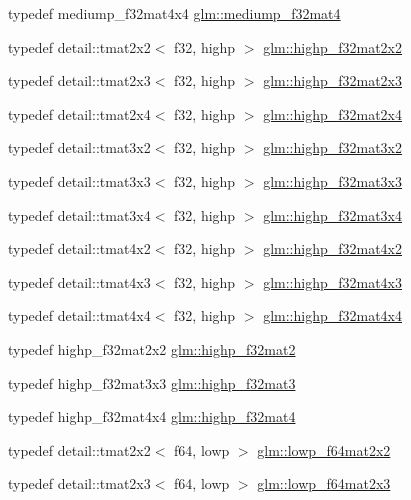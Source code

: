 \begin{CompactItemize}
typedef mediump\_\-f32mat4x4 \hyperlink{group__gtc__type__precision_g56bd98ec31b6abc0315d688d4ecd94a0}{glm::mediump\_\-f32mat4}
\item 
typedef detail::tmat2x2$<$ f32, highp $>$ \hyperlink{group__gtc__type__precision_gf3a2cc948ca6fd168391138ce6fdd100}{glm::highp\_\-f32mat2x2}
\item 
typedef detail::tmat2x3$<$ f32, highp $>$ \hyperlink{group__gtc__type__precision_g53613c1b93f81207065a8a935ff02a81}{glm::highp\_\-f32mat2x3}
\item 
typedef detail::tmat2x4$<$ f32, highp $>$ \hyperlink{group__gtc__type__precision_g9689dbe21bc976ca8069c63300b5887e}{glm::highp\_\-f32mat2x4}
\item 
typedef detail::tmat3x2$<$ f32, highp $>$ \hyperlink{group__gtc__type__precision_gf36b2b34ea881977c61491b0d3b25a28}{glm::highp\_\-f32mat3x2}
\item 
typedef detail::tmat3x3$<$ f32, highp $>$ \hyperlink{group__gtc__type__precision_g334eca23d23aef90972fb20c5b749ca3}{glm::highp\_\-f32mat3x3}
\item 
typedef detail::tmat3x4$<$ f32, highp $>$ \hyperlink{group__gtc__type__precision_ga71f504ecb02f9178026b01013b77ba0}{glm::highp\_\-f32mat3x4}
\item 
typedef detail::tmat4x2$<$ f32, highp $>$ \hyperlink{group__gtc__type__precision_g4d799497b303c2434fe709f81f6bd4dd}{glm::highp\_\-f32mat4x2}
\item 
typedef detail::tmat4x3$<$ f32, highp $>$ \hyperlink{group__gtc__type__precision_g5bd692575886422f501a379386e391d9}{glm::highp\_\-f32mat4x3}
\item 
typedef detail::tmat4x4$<$ f32, highp $>$ \hyperlink{group__gtc__type__precision_gfe24f12e4f5453058caea3f583ad7d9c}{glm::highp\_\-f32mat4x4}
\item 
typedef highp\_\-f32mat2x2 \hyperlink{group__gtc__type__precision_ged934f561aaf8ad891c0a8f5e719aea8}{glm::highp\_\-f32mat2}
\item 
typedef highp\_\-f32mat3x3 \hyperlink{group__gtc__type__precision_g06809818db73785334f839742a9ad85a}{glm::highp\_\-f32mat3}
\item 
typedef highp\_\-f32mat4x4 \hyperlink{group__gtc__type__precision_gc14c1bfb647e39d459c7489ede2156cc}{glm::highp\_\-f32mat4}
\item 
typedef detail::tmat2x2$<$ f64, lowp $>$ \hyperlink{group__gtc__type__precision_g38e41c5332b4eb20b23b4ed1f06608d4}{glm::lowp\_\-f64mat2x2}
\item 
typedef detail::tmat2x3$<$ f64, lowp $>$ \hyperlink{group__gtc__type__precision_g2add7d48faba102f53fbad2e14dfed12}{glm::lowp\_\-f64mat2x3}

\end{CompactItemize}
